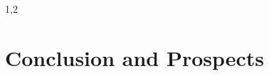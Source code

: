 \documentclass[11pt,a4paper,twoside]{article}
\numberwithin{equation}{section}
\begin{document}
\begin{spacing}{1,2}
\section{Conclusion and Prospects}
% 
% 
% 

\end{spacing}
\newpage
\end{document}
